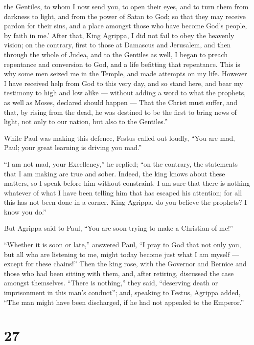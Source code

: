 the Gentiles, to whom I now send you,  to open their eyes,
and to turn them from darkness to light, and from the power of Satan to
God; so that they may receive pardon for their sins, and a place amongst
those who have become God's people, by faith in me.'  After
that, King Agrippa, I did not fail to obey the heavenly vision;
 on the contrary, first to those at Damascus and Jerusalem,
and then through the whole of Judea, and to the Gentiles as well, I
began to preach repentance and conversion to God, and a life befitting
that repentance.  This is why some men seized me in the
Temple, and made attempts on my life.  However I have
received help from God to this very day, and so stand here, and bear my
testimony to high and low alike --- without adding a word to what the
prophets, as well as Moses, declared should happen --- 
That the Christ must suffer, and that, by rising from the dead, he was
destined to be the first to bring news of light, not only to our nation,
but also to the Gentiles.''

 While Paul was making this defence, Festus called out
loudly, ``You are mad, Paul; your great learning is driving you mad.''

 ``I am not mad, your Excellency,'' he replied; ``on the
contrary, the statements that I am making are true and sober.
 Indeed, the king knows about these matters, so I speak
before him without constraint. I am sure that there is nothing whatever
of what I have been telling him that has escaped his attention; for all
this has not been done in a corner.  King Agrippa, do you
believe the prophets? I know you do.''

 But Agrippa said to Paul, ``You are soon trying to make a
Christian of me!''

 ``Whether it is soon or late,'' answered Paul, ``I pray to
God that not only you, but all who are listening to me, might today
become just what I am myself --- except for these chains!''
 Then the king rose, with the Governor and Bernice and
those who had been sitting with them,  and, after retiring,
discussed the case amongst themselves. ``There is nothing,'' they said,
``deserving death or imprisonment in this man's conduct''; 
and, speaking to Festus, Agrippa added, ``The man might have been
discharged, if he had not appealed to the Emperor.''

\hypertarget{section-26}{%
\section{27}\label{section-26}}

